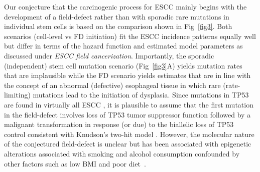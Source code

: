 \documentclass[10pt,letterpaper]{article}
\begin{document}
Our conjecture that the carcinogenic process for ESCC mainly begins with the development of a field-defect rather than with sporadic rare mutations in individual stem cells is based on the comparison shown in Fig~\ref{fig3}. Both scenarios (cell-level vs FD initiation) fit the ESCC incidence patterns equally well but differ in terms of the hazard function and estimated model parameters as discussed under {\it ESCC field cancerization}. Importantly, the sporadic (independent) stem cell mutation scenario (Fig~\ref{fig3}A) yields mutation rates that are implausible while the FD scenario yields estimates that are in line with the concept of an abnormal (defective) esophageal tissue in which rare (rate-limiting) mutations lead to the initiation of dysplasia. Since mutations in TP53 are found in virtually all ESCC \cite{Agrawal2012, TCGAeso2017}, it is plausible to assume that the first mutation in the field-defect involves loss of TP53 tumor suppressor function followed by a malignant transformation in response (or due) to the biallelic loss of TP53 control consistent with Knudson's two-hit model \cite{Knudson1973}. However, the molecular nature of the conjectured field-defect is unclear but has been associated with epigenetic alterations associated with smoking and alcohol consumption confounded by other factors such as low BMI and poor diet~\cite{Lee2011}. 

\end{document}
